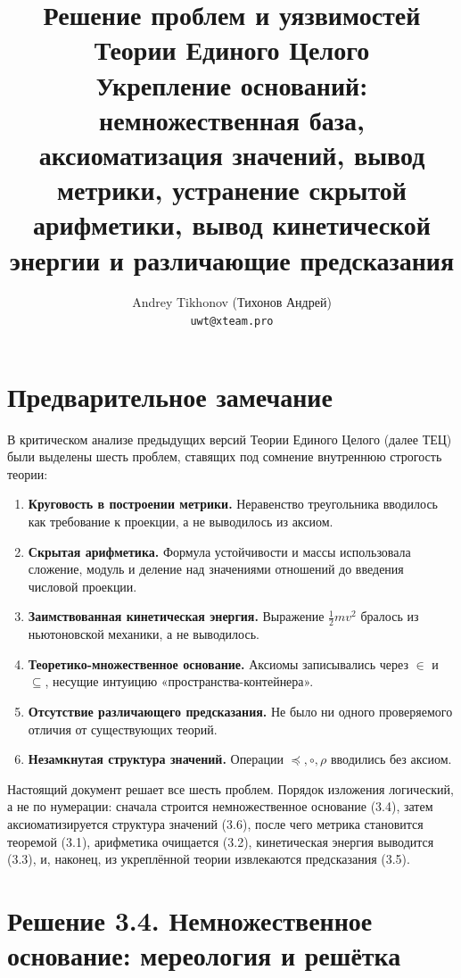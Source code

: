 \documentclass[12pt,a4paper]{article}
\title{\textbf{Решение проблем и уязвимостей Теории Единого Целого}\\[0.5em]
\large Укрепление оснований: немножественная база, аксиоматизация значений,
вывод метрики, устранение скрытой арифметики, вывод кинетической энергии и
различающие предсказания}
\author{Andrey Tikhonov (Тихонов Андрей)\\\texttt{uwt@xteam.pro}}
\date{}
\theoremstyle{definition}
\theoremstyle{plain}
\theoremstyle{remark}
\newcommand{\comp}{\circ}
\newcommand{\Vord}{\preceq}
\newcommand{\norm}{\rho}
\begin{document}
\maketitle
\tableofcontents
\newpage

\section*{Предварительное замечание}

В критическом анализе предыдущих версий Теории Единого Целого (далее ТЕЦ) были
выделены шесть проблем, ставящих под сомнение внутреннюю строгость теории:

\begin{enumerate}
    \item[(3.1)] \textbf{Круговость в построении метрики.} Неравенство
    треугольника вводилось как требование к проекции, а не выводилось из аксиом.
    \item[(3.2)] \textbf{Скрытая арифметика.} Формула устойчивости и массы
    использовала сложение, модуль и деление над значениями отношений до введения
    числовой проекции.
    \item[(3.3)] \textbf{Заимствованная кинетическая энергия.} Выражение
    $\tfrac12 m v^2$ бралось из ньютоновской механики, а не выводилось.
    \item[(3.4)] \textbf{Теоретико-множественное основание.} Аксиомы записывались
    через $\in$ и $\subseteq$, несущие интуицию «пространства-контейнера».
    \item[(3.5)] \textbf{Отсутствие различающего предсказания.} Не было ни одного
    проверяемого отличия от существующих теорий.
    \item[(3.6)] \textbf{Незамкнутая структура значений.} Операции
    $\Vord,\comp,\norm$ вводились без аксиом.
\end{enumerate}

Настоящий документ решает все шесть проблем. Порядок изложения логический, а не
по нумерации: сначала строится немножественное основание (3.4), затем
аксиоматизируется структура значений (3.6), после чего метрика становится
теоремой (3.1), арифметика очищается (3.2), кинетическая энергия выводится (3.3),
и, наконец, из укреплённой теории извлекаются предсказания (3.5).

\section{Решение 3.4. Немножественное основание: мереология и решётка}
\end{document}
